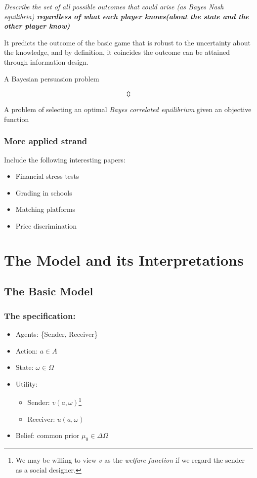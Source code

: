 \documentclass[12pt,letterpaper]{article}
\theoremstyle{definition}   %
\begin{document}
\emph{Describe the set of all possible outcomes that could arise (as Bayes Nash equilibria) \textbf{regardless of what each player knows(about the state and the other player know)}}


It predicts the outcome of the basic game that is robust to the uncertainty about the knowledge, and by definition, it coincides the outcome can be attained through information design.

\begin{center}
	A Bayesian persuasion problem

\[\Updownarrow\]

A problem of selecting an optimal \emph{Bayes correlated equilibrium} given an objective function 

\end{center}


\subsubsection*{More applied strand}
Include the following interesting papers:
\begin{itemize}
	\item Financial stress tests \citep{goldstein2018stress}
	\item Grading in schools \citep{ostrovsky2010information}
	\item Matching platforms \citep{romanyuk2019cream}
	\item Price discrimination \citep{bergemann2015limits}
\end{itemize}


\section{The Model and its Interpretations}

\subsection{The Basic Model}

\subsubsection*{The specification:}
\begin{itemize}
	\item Agents: \{Sender, Receiver\}
	\item Action: $a \in A$
	\item State: $\omega \in \Omega$ 
	\item Utility: 
	\begin{itemize}
		\item Sender: $v(a, \omega)$\footnote{We may be willing to view $v$ as the \emph{welfare function} if we regard the sender as a social designer.}
		\item Receiver: $u(a, \omega)$
	\end{itemize}
	\item Belief: common prior $\mu_0 \in \Delta \Omega$
\end{itemize}
\end{document}
